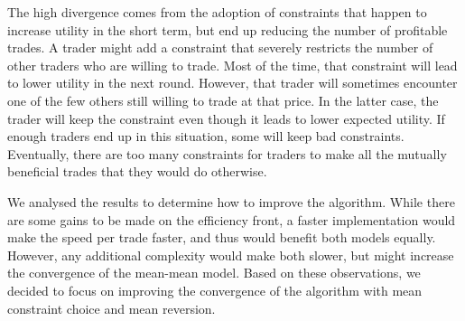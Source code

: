 \documentclass[12pt,a4paper,titlepage]{article}
\begin{document}
The high divergence comes from the adoption of constraints that happen to increase utility in the short term, but end up reducing the number of profitable trades.
A trader might add a constraint that severely restricts the number of other traders who are willing to trade.
Most of the time, that constraint will lead to lower utility in the next round.
However, that trader will sometimes encounter one of the few others still willing to trade at that price.
In the latter case, the trader will keep the constraint even though it leads to lower expected utility.
If enough traders end up in this situation, some will keep bad constraints.
Eventually, there are too many constraints for traders to make all the mutually beneficial trades that they would do otherwise.

We analysed the results to determine how to improve the algorithm.
While there are some gains to be made on the efficiency front, a faster implementation would make the speed per trade faster, and thus would benefit both models equally.
However, any additional complexity would make both slower, but might increase the convergence of the mean-mean model.
Based on these observations, we decided to focus on improving the convergence of the algorithm with mean constraint choice and mean reversion.
\end{document}
